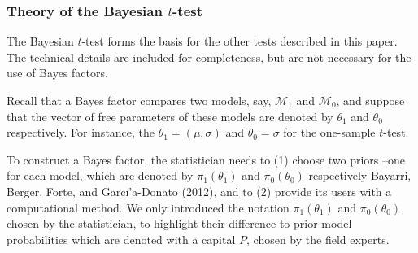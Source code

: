 \documentclass[english,,doc,floatsintext]{apa6}
\begin{document}
\hypertarget{theory-of-the-bayesian-t-test}{%
\subsubsection{\texorpdfstring{Theory of the Bayesian \(t\)-test}{Theory of the Bayesian t-test}}\label{theory-of-the-bayesian-t-test}}

The Bayesian \(t\)-test forms the basis for the other tests described in this paper. The technical details are included for completeness, but are not necessary for the use of Bayes factors.

Recall that a Bayes factor compares two models, say, \(\mathcal{M}_{1}\) and \(\mathcal{M}_{0}\), and suppose that the vector of free parameters of these models are denoted by \(\theta_{1}\) and \(\theta_{0}\) respectively. For instance, the \(\theta_{1} = ( \mu, \sigma)\) and \(\theta_{0} = \sigma\) for the one-sample \(t\)-test.

To construct a Bayes factor, the statistician needs to (1) choose two priors --one for each model, which are denoted by \(\pi_{1} (\theta_{1})\) and \(\pi_{0} (\theta_{0})\) respectively Bayarri, Berger, Forte, and Garcı'a-Donato (2012), and to (2) provide its users with a computational method. We only introduced the notation \(\pi_{1} (\theta_{1})\) and \(\pi_{0} (\theta_{0})\), chosen by the statistician, to highlight their difference to prior model probabilities which are denoted with a capital \(P\), chosen by the field experts.
\end{document}
